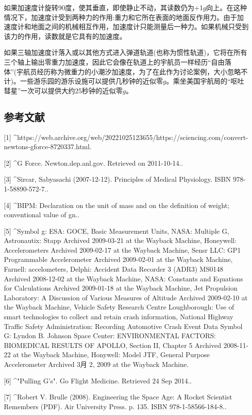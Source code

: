 如果加速度计旋转90度，使其垂直，即使静止不动，其读数仍为+1$g$向上。在这种情况下，加速度计受到两种力的作用:重力和它所在表面的地面反作用力。由于加速度计和地面之间的机械相互作用，加速度计只能测量后一种力。如果机械只受到该力的作用，读数就是它具有的加速度。

如果三轴加速度计落入或以其他方式进入弹道轨道(也称为惯性轨道)，它将在所有三个轴上输出零重力加速度，因此它会像在轨道上的宇航员一样经历“自由落体”(宇航员经历称为微重力的小潮汐加速度，为了在此作为讨论案例，大小忽略不计)。一些游乐园的游乐设施可以提供几秒钟的近似零$g$。乘坐美国宇航局的“呕吐彗星”一次可以提供大约25秒钟的近似零$g$。

\subsection{参考文献}
[1]
^https://web.archive.org/web/20221025123655/https://sciencing.com/convert-newtons-gforce-8720337.html.

[2]
^G Force. Newton.dep.anl.gov. Retrieved on 2011-10-14..

[3]
^Sircar, Sabyasachi (2007-12-12). Principles of Medical Physiology. ISBN 978-1-58890-572-7..

[4]
^BIPM: Declaration on the unit of mass and on the definition of weight; conventional value of gn..

[5]
^Symbol g: ESA: GOCE, Basic Measurement Units, NASA: Multiple G, Astronautix: Stapp Archived 2009-03-21 at the Wayback Machine, Honeywell: Accelerometers Archived 2009-02-17 at the Wayback Machine, Sensr LLC: GP1 Programmable Accelerometer Archived 2009-02-01 at the Wayback Machine, Farnell: accelometers, Delphi: Accident Data Recorder 3 (ADR3) MS0148 Archived 2008-12-02 at the Wayback Machine, NASA: Constants and Equations for Calculations Archived 2009-01-18 at the Wayback Machine, Jet Propulsion Laboratory: A Discussion of Various Measures of Altitude Archived 2009-02-10 at the Wayback Machine, Vehicle Safety Research Centre Loughborough: Use of smart technologies to collect and retain crash information, National Highway Traffic Safety Administration: Recording Automotive Crash Event Data Symbol G: Lyndon B. Johnson Space Center: ENVIRONMENTAL FACTORS: BIOMEDICAL RESULTS OF APOLLO, Section II, Chapter 5 Archived 2008-11-22 at the Wayback Machine, Honywell: Model JTF, General Purpose Accelerometer Archived 3月 2, 2009 at the Wayback Machine.

[6]
^"Pulling G's". Go Flight Medicine. Retrieved 24 Sep 2014..

[7]
^Robert V. Brulle (2008). Engineering the Space Age: A Rocket Scientist Remembers (PDF). Air University Press. p. 135. ISBN 978-1-58566-184-8..

